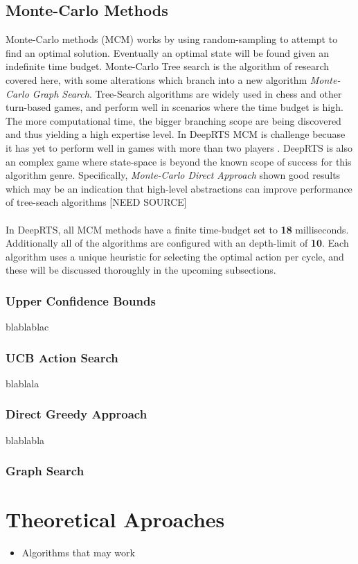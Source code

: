 \documentclass[fleqn,10pt]{SelfArx} %
\begin{document}
\subsection{Monte-Carlo Methods}
Monte-Carlo methods (MCM) works by using random-sampling to attempt to find an optimal solution. Eventually an optimal state will be found given an indefinite time budget. Monte-Carlo Tree search is the algorithm of research covered here, with some alterations which branch into a new algorithm \textit{Monte-Carlo Graph Search}.
Tree-Search algorithms are widely used in chess and other turn-based games, and perform well in scenarios where the time budget is high. The more computational time, the bigger branching scope are being discovered and thus yielding a high expertise level.
In DeepRTS MCM is challenge becuase it has yet to perform well in games with more than two players . DeepRTS is also an complex game where state-space is beyond the known scope of success for this algorithm genre. Specifically, \textit{Monte-Carlo Direct Approach} shown good results which may be an indication that high-level abstractions can improve performance of tree-seach algorithms [NEED SOURCE]
\\
\\
In DeepRTS, all MCM methods have a finite time-budget set to \textbf{18} milliseconds. Additionally all of the algorithms are configured with an depth-limit of \textbf{10}. 
Each algorithm uses a unique heuristic for selecting the optimal action per cycle, and these will be discussed thoroughly in the upcoming subsections.
\subsubsection*{Upper Confidence Bounds}
blablablac

\subsubsection*{UCB Action Search}
blablala

\subsubsection*{Direct Greedy Approach}
blablabla

\subsubsection*{Graph Search}

\section{Theoretical Aproaches}
\begin{itemize}
    \item Algorithms that may work
\end{itemize}
\end{document}
